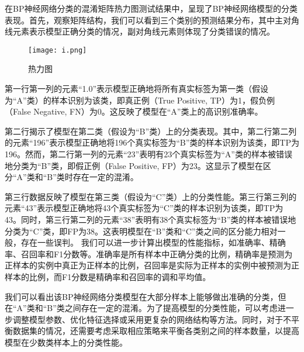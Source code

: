 \documentclass[12pt,a4paper]{nmmcm}
\begin{document}
在BP神经网络分类的混淆矩阵热力图测试结果中，呈现了BP神经网络模型的分类表现。首先，观察矩阵结构，我们可以看到三个类别的预测结果分布，其中主对角线元素表示模型正确分类的情况，副对角线元素则体现了分类错误的情况。
\begin{figure}[h]
    \centering
    \texttt{[image: i.png]}
    \caption{热力图}
    \label{fig:enter-label}
\end{figure}
第一行第一列的元素“1.0”表示模型正确地将所有真实标签为第一类（假设为“A”类）的样本识别为该类，即真正例（True Positive, TP）为1，假负例（False Negative, FN）为0。这反映了模型在“A”类上的高识别准确率。

第二行揭示了模型在第二类（假设为“B”类）上的分类表现。其中，第二行第二列的元素“196”表示模型正确地将196个真实标签为“B”类的样本识别为该类，即TP为196。然而，第二行第一列的元素“23”表明有23个真实标签为“A”类的样本被错误地分类为“B”类，即假正例（False Positive, FP）为23。这显示了模型在区分“A”类和“B”类时存在一定的混淆。

第三行数据反映了模型在第三类（假设为“C”类）上的分类性能。第三行第三列的元素“43”表示模型正确地将43个真实标签为“C”类的样本识别为该类，即TP为43。同时，第三行第二列的元素“38”表明有38个真实标签为“B”类的样本被错误地分类为“C”类，即FP为38。这表明模型在“B”类和“C”类之间的区分能力相对一般，存在一些误判。
我们可以进一步计算出模型的性能指标，如准确率、精确率、召回率和F1分数等。准确率是所有样本中正确分类的比例，精确率是预测为正样本的实例中真正为正样本的比例，召回率是实际为正样本的实例中被预测为正样本的比例，而F1分数是精确率和召回率的调和平均值。

我们可以看出该BP神经网络分类模型在大部分样本上能够做出准确的分类，但在“A”类和“B”类之间存在一定的混淆。为了提高模型的分类性能，可以考虑进一步调整模型参数、优化特征选择或采用更复杂的网络结构等方法。同时，对于不平衡数据集的情况，还需要考虑采取相应策略来平衡各类别之间的样本数量，以提高模型在少数类样本上的分类性能。

\\
\end{document}
